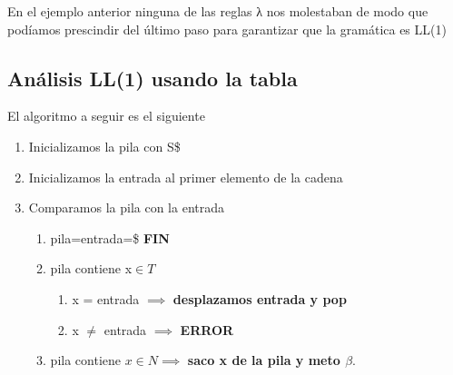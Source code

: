 \documentclass{apuntes}
\begin{document}
En el ejemplo anterior ninguna de las reglas λ nos molestaban de modo que podíamos prescindir del último paso para garantizar que la gramática es LL(1)

\subsection{Análisis LL(1) usando la tabla}
El algoritmo a seguir es el siguiente
\begin{enumerate}
\item Inicializamos la pila con S\$
\item Inicializamos la entrada al primer elemento de la cadena
\item Comparamos la pila con la entrada
\begin{enumerate}
\item pila=entrada=\$ \textbf{FIN}
\item pila contiene x$\in T$
\begin{enumerate}
\item x = entrada $\implies$ \textbf{desplazamos entrada y pop}
\item x $\neq$ entrada $\implies$ \textbf{ERROR}
\end{enumerate}
\item pila contiene $x \in N \implies$ \textbf{saco x de la pila y meto $\beta$}.
\end{enumerate}
\end{enumerate}
\end{document}
